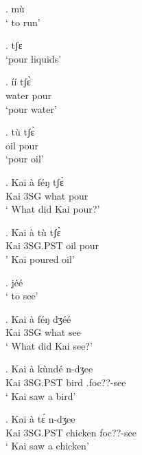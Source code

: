 \documentclass{assets/fieldnotes}
\begin{document}
\ex. mù\\
` to run'

\ex. tʃɛ\\
`pour liquids'

\exg. íí tʃɛ̀\\
water pour\\
`pour water'

\exg. tù tʃɛ̀\\
oil pour\\
`pour oil'

\exg. Kai à féŋ tʃɛ̀\\
Kai 3SG what pour\\
` What did Kai pour?'


\exg. Kai à tù tʃɛ̀\\
Kai 3SG.PST oil pour\\
' Kai poured oil'


\ex. jéé\\
` to see'

\exg. Kai à féŋ dʒéé\\
Kai 3SG what see\\
` What did Kai see?'

\exg. Kai à kùndé n-dʒee\\
Kai 3SG.PST bird .foc??-see\\
` Kai saw a bird'

\exg. Kai à tɛ́ n-dʒee\\
Kai 3SG.PST chicken foc??-see\\
` Kai saw a chicken'
\end{document}
